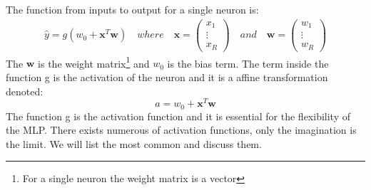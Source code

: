 The function from inputs to output for a single neuron is:
\begin{align*}   
\hat{y}=g(w_0 + \bm{x}^T \bm{w}) \quad where \quad \bm{x}=\begin{pmatrix}
x_1 \\
\vdots\\
x_R
\end{pmatrix} \quad and \quad \bm{w}=\begin{pmatrix}
w_1 \\
\vdots \\
w_R
\end{pmatrix}
\end{align*}
The $\bm{w}$ is the weight matrix\footnote{For a single neuron the weight matrix is a vector} and $w_0$ is the bias term. The term inside the function g is the activation of the neuron and it is a affine transformation denoted:
$$a= w_0 + \bm{x}^T \bm{w}$$
The function g is the activation function and it is essential for the flexibility of the MLP. There exists numerous of activation functions, only the imagination is the limit. We will list the most common and discuss them.


